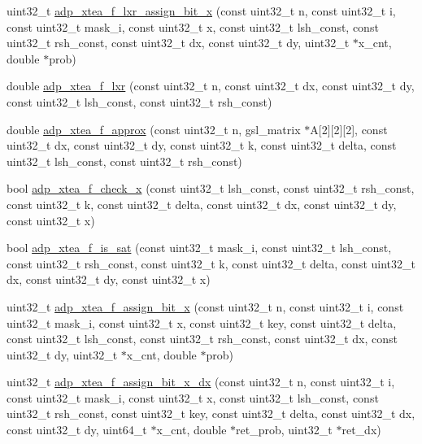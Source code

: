 \begin{DoxyCompactItemize}
\item 
uint32\-\_\-t \hyperlink{adp-xtea-f-fk_8cc_af74a681555779872337a4e2ad155bcb8}{adp\-\_\-xtea\-\_\-f\-\_\-lxr\-\_\-assign\-\_\-bit\-\_\-x} (const uint32\-\_\-t n, const uint32\-\_\-t i, const uint32\-\_\-t mask\-\_\-i, const uint32\-\_\-t x, const uint32\-\_\-t lsh\-\_\-const, const uint32\-\_\-t rsh\-\_\-const, const uint32\-\_\-t dx, const uint32\-\_\-t dy, uint32\-\_\-t $\ast$x\-\_\-cnt, double $\ast$prob)
\item 
double \hyperlink{adp-xtea-f-fk_8cc_aecdf4a2934283c36f0ee6a9778576cb2}{adp\-\_\-xtea\-\_\-f\-\_\-lxr} (const uint32\-\_\-t n, const uint32\-\_\-t dx, const uint32\-\_\-t dy, const uint32\-\_\-t lsh\-\_\-const, const uint32\-\_\-t rsh\-\_\-const)
\item 
double \hyperlink{adp-xtea-f-fk_8cc_a07bf299450a988931eb46ec5cca05150}{adp\-\_\-xtea\-\_\-f\-\_\-approx} (const uint32\-\_\-t n, gsl\-\_\-matrix $\ast$\-A\mbox{[}2\mbox{]}\mbox{[}2\mbox{]}\mbox{[}2\mbox{]}, const uint32\-\_\-t dx, const uint32\-\_\-t dy, const uint32\-\_\-t k, const uint32\-\_\-t delta, const uint32\-\_\-t lsh\-\_\-const, const uint32\-\_\-t rsh\-\_\-const)
\item 
bool \hyperlink{adp-xtea-f-fk_8cc_a0dbedc6aafa2653058d001b6ba96aacd}{adp\-\_\-xtea\-\_\-f\-\_\-check\-\_\-x} (const uint32\-\_\-t lsh\-\_\-const, const uint32\-\_\-t rsh\-\_\-const, const uint32\-\_\-t k, const uint32\-\_\-t delta, const uint32\-\_\-t dx, const uint32\-\_\-t dy, const uint32\-\_\-t x)
\item 
bool \hyperlink{adp-xtea-f-fk_8cc_ad75b1fd6b21a158370f0300b3074b5ee}{adp\-\_\-xtea\-\_\-f\-\_\-is\-\_\-sat} (const uint32\-\_\-t mask\-\_\-i, const uint32\-\_\-t lsh\-\_\-const, const uint32\-\_\-t rsh\-\_\-const, const uint32\-\_\-t k, const uint32\-\_\-t delta, const uint32\-\_\-t dx, const uint32\-\_\-t dy, const uint32\-\_\-t x)
\item 
uint32\-\_\-t \hyperlink{adp-xtea-f-fk_8cc_abcc84ea73f206764cf21c8202c83a240}{adp\-\_\-xtea\-\_\-f\-\_\-assign\-\_\-bit\-\_\-x} (const uint32\-\_\-t n, const uint32\-\_\-t i, const uint32\-\_\-t mask\-\_\-i, const uint32\-\_\-t x, const uint32\-\_\-t key, const uint32\-\_\-t delta, const uint32\-\_\-t lsh\-\_\-const, const uint32\-\_\-t rsh\-\_\-const, const uint32\-\_\-t dx, const uint32\-\_\-t dy, uint32\-\_\-t $\ast$x\-\_\-cnt, double $\ast$prob)
\item 
uint32\-\_\-t \hyperlink{adp-xtea-f-fk_8cc_a6e6f95b87e441a40670f3c03ff0dc7b4}{adp\-\_\-xtea\-\_\-f\-\_\-assign\-\_\-bit\-\_\-x\-\_\-dx} (const uint32\-\_\-t n, const uint32\-\_\-t i, const uint32\-\_\-t mask\-\_\-i, const uint32\-\_\-t x, const uint32\-\_\-t lsh\-\_\-const, const uint32\-\_\-t rsh\-\_\-const, const uint32\-\_\-t key, const uint32\-\_\-t delta, const uint32\-\_\-t dx, const uint32\-\_\-t dy, uint64\-\_\-t $\ast$x\-\_\-cnt, double $\ast$ret\-\_\-prob, uint32\-\_\-t $\ast$ret\-\_\-dx)

\end{DoxyCompactItemize}
